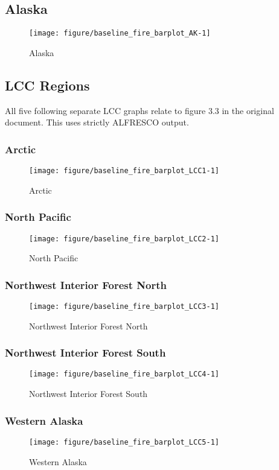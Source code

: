 \documentclass{article}\usepackage[]{graphicx}\usepackage[]{color}
\makeatletter
\def\maxwidth{ %
  \ifdim\Gin@nat@width>\linewidth
    \linewidth
  \else
    \Gin@nat@width
  \fi
}
\makeatother
\begin{document}
\subsection{Alaska}
\begin{figure}[H]
\texttt{[image: figure/baseline\_fire\_barplot\_AK-1]} \caption[Alaska]{Alaska\label{fig:baseline_fire_barplot_AK}}
\end{figure}



\newpage
\subsection{LCC Regions}
All five following separate LCC graphs relate to figure 3.3 in the original document.
This uses strictly ALFRESCO output.

\subsubsection{Arctic}
\begin{figure}[H]
\texttt{[image: figure/baseline\_fire\_barplot\_LCC1-1]} \caption[Arctic]{Arctic\label{fig:baseline_fire_barplot_LCC1}}
\end{figure}



\subsubsection{North Pacific}
\begin{figure}[H]
\texttt{[image: figure/baseline\_fire\_barplot\_LCC2-1]} \caption[North Pacific]{North Pacific\label{fig:baseline_fire_barplot_LCC2}}
\end{figure}



\subsubsection{Northwest Interior Forest North}
\begin{figure}[H]
\texttt{[image: figure/baseline\_fire\_barplot\_LCC3-1]} \caption[Northwest Interior Forest North]{Northwest Interior Forest North\label{fig:baseline_fire_barplot_LCC3}}
\end{figure}



\subsubsection{Northwest Interior Forest South}
\begin{figure}[H]
\texttt{[image: figure/baseline\_fire\_barplot\_LCC4-1]} \caption[Northwest Interior Forest South]{Northwest Interior Forest South\label{fig:baseline_fire_barplot_LCC4}}
\end{figure}



\subsubsection{Western Alaska}
\begin{figure}[H]
\texttt{[image: figure/baseline\_fire\_barplot\_LCC5-1]} \caption[Western Alaska]{Western Alaska\label{fig:baseline_fire_barplot_LCC5}}
\end{figure}
\end{document}
